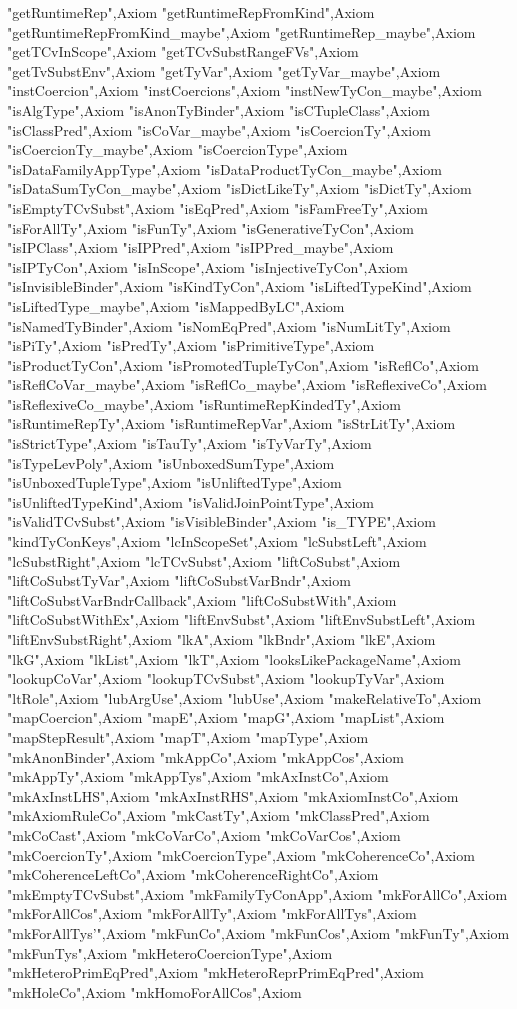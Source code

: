 {"getRuntimeRep"},{Axiom "getRuntimeRepFromKind"},{Axiom "getRuntimeRepFromKind_maybe"},{Axiom "getRuntimeRep_maybe"},{Axiom "getTCvInScope"},{Axiom "getTCvSubstRangeFVs"},{Axiom "getTvSubstEnv"},{Axiom "getTyVar"},{Axiom "getTyVar_maybe"},{Axiom "instCoercion"},{Axiom "instCoercions"},{Axiom "instNewTyCon_maybe"},{Axiom "isAlgType"},{Axiom "isAnonTyBinder"},{Axiom "isCTupleClass"},{Axiom "isClassPred"},{Axiom "isCoVar_maybe"},{Axiom "isCoercionTy"},{Axiom "isCoercionTy_maybe"},{Axiom "isCoercionType"},{Axiom "isDataFamilyAppType"},{Axiom "isDataProductTyCon_maybe"},{Axiom "isDataSumTyCon_maybe"},{Axiom "isDictLikeTy"},{Axiom "isDictTy"},{Axiom "isEmptyTCvSubst"},{Axiom "isEqPred"},{Axiom "isFamFreeTy"},{Axiom "isForAllTy"},{Axiom "isFunTy"},{Axiom "isGenerativeTyCon"},{Axiom "isIPClass"},{Axiom "isIPPred"},{Axiom "isIPPred_maybe"},{Axiom "isIPTyCon"},{Axiom "isInScope"},{Axiom "isInjectiveTyCon"},{Axiom "isInvisibleBinder"},{Axiom "isKindTyCon"},{Axiom "isLiftedTypeKind"},{Axiom "isLiftedType_maybe"},{Axiom "isMappedByLC"},{Axiom "isNamedTyBinder"},{Axiom "isNomEqPred"},{Axiom "isNumLitTy"},{Axiom "isPiTy"},{Axiom "isPredTy"},{Axiom "isPrimitiveType"},{Axiom "isProductTyCon"},{Axiom "isPromotedTupleTyCon"},{Axiom "isReflCo"},{Axiom "isReflCoVar_maybe"},{Axiom "isReflCo_maybe"},{Axiom "isReflexiveCo"},{Axiom "isReflexiveCo_maybe"},{Axiom "isRuntimeRepKindedTy"},{Axiom "isRuntimeRepTy"},{Axiom "isRuntimeRepVar"},{Axiom "isStrLitTy"},{Axiom "isStrictType"},{Axiom "isTauTy"},{Axiom "isTyVarTy"},{Axiom "isTypeLevPoly"},{Axiom "isUnboxedSumType"},{Axiom "isUnboxedTupleType"},{Axiom "isUnliftedType"},{Axiom "isUnliftedTypeKind"},{Axiom "isValidJoinPointType"},{Axiom "isValidTCvSubst"},{Axiom "isVisibleBinder"},{Axiom "is_TYPE"},{Axiom "kindTyConKeys"},{Axiom "lcInScopeSet"},{Axiom "lcSubstLeft"},{Axiom "lcSubstRight"},{Axiom "lcTCvSubst"},{Axiom "liftCoSubst"},{Axiom "liftCoSubstTyVar"},{Axiom "liftCoSubstVarBndr"},{Axiom "liftCoSubstVarBndrCallback"},{Axiom "liftCoSubstWith"},{Axiom "liftCoSubstWithEx"},{Axiom "liftEnvSubst"},{Axiom "liftEnvSubstLeft"},{Axiom "liftEnvSubstRight"},{Axiom "lkA"},{Axiom "lkBndr"},{Axiom "lkE"},{Axiom "lkG"},{Axiom "lkList"},{Axiom "lkT"},{Axiom "looksLikePackageName"},{Axiom "lookupCoVar"},{Axiom "lookupTCvSubst"},{Axiom "lookupTyVar"},{Axiom "ltRole"},{Axiom "lubArgUse"},{Axiom "lubUse"},{Axiom "makeRelativeTo"},{Axiom "mapCoercion"},{Axiom "mapE"},{Axiom "mapG"},{Axiom "mapList"},{Axiom "mapStepResult"},{Axiom "mapT"},{Axiom "mapType"},{Axiom "mkAnonBinder"},{Axiom "mkAppCo"},{Axiom "mkAppCos"},{Axiom "mkAppTy"},{Axiom "mkAppTys"},{Axiom "mkAxInstCo"},{Axiom "mkAxInstLHS"},{Axiom "mkAxInstRHS"},{Axiom "mkAxiomInstCo"},{Axiom "mkAxiomRuleCo"},{Axiom "mkCastTy"},{Axiom "mkClassPred"},{Axiom "mkCoCast"},{Axiom "mkCoVarCo"},{Axiom "mkCoVarCos"},{Axiom "mkCoercionTy"},{Axiom "mkCoercionType"},{Axiom "mkCoherenceCo"},{Axiom "mkCoherenceLeftCo"},{Axiom "mkCoherenceRightCo"},{Axiom "mkEmptyTCvSubst"},{Axiom "mkFamilyTyConApp"},{Axiom "mkForAllCo"},{Axiom "mkForAllCos"},{Axiom "mkForAllTy"},{Axiom "mkForAllTys"},{Axiom "mkForAllTys'"},{Axiom "mkFunCo"},{Axiom "mkFunCos"},{Axiom "mkFunTy"},{Axiom "mkFunTys"},{Axiom "mkHeteroCoercionType"},{Axiom "mkHeteroPrimEqPred"},{Axiom "mkHeteroReprPrimEqPred"},{Axiom "mkHoleCo"},{Axiom "mkHomoForAllCos"},{Axiom }
